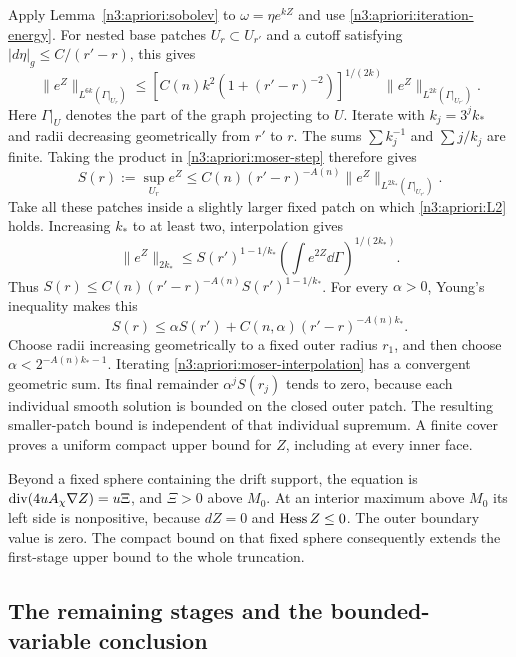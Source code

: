 Apply Lemma~\ref{n3:apriori:sobolev} to $\omega=\eta e^{kZ}$ and use
\eqref{n3:apriori:iteration-energy}.  For nested base patches
$U_r\subset U_{r'}$ and a cutoff satisfying
$|d\eta|_g\le C/(r'-r)$, this gives
\begin{equation}
 \|e^Z\|_{L^{6k}(\Gamma|_{U_r})}
 \le\left[C(n)k^2(1+(r'-r)^{-2})\right]^{1/(2k)}
                  \|e^Z\|_{L^{2k}(\Gamma|_{U_{r'}})}.
 \label{n3:apriori:moser-step}
\end{equation}
Here $\Gamma|_U$ denotes the part of the graph projecting to $U$.
Iterate with $k_j=3^jk_*$ and radii decreasing geometrically from
$r'$ to $r$.  The sums $\sum k_j^{-1}$ and $\sum j/k_j$ are finite.
Taking the product in \eqref{n3:apriori:moser-step} therefore gives
\begin{equation}
 S(r):=\sup_{U_r}e^Z
 \le C(n)(r'-r)^{-A(n)}
             \|e^Z\|_{L^{2k_*}(\Gamma|_{U_{r'}})}.
 \label{n3:apriori:moser-high-norm}
\end{equation}
Take all these patches inside a slightly larger fixed patch on
which \eqref{n3:apriori:L2} holds.  Increasing $k_*$ to at least two,
interpolation gives
\[
 \|e^Z\|_{2k_*}
 \le S(r')^{1-1/k_*}
                  \left(\int e^{2Z}\dd\Gamma\right)^{1/(2k_*)}.
\]
Thus $S(r)\le C(n)(r'-r)^{-A(n)}S(r')^{1-1/k_*}$.
For every $\alpha>0$, Young's inequality makes this
\begin{equation}
 S(r)\le\alpha S(r')+
                   C(n,\alpha)(r'-r)^{-A(n)k_*}.
 \label{n3:apriori:moser-interpolation}
\end{equation}
Choose radii increasing geometrically to a fixed outer radius $r_1$,
and then choose $\alpha<2^{-A(n)k_*-1}$.  Iterating
\eqref{n3:apriori:moser-interpolation} has a convergent geometric sum.
Its final remainder $\alpha^jS(r_j)$ tends to zero, because each
individual smooth solution is bounded on the closed outer patch.
The resulting smaller-patch bound is independent of that individual
supremum.  A finite cover proves a uniform compact upper bound for
$Z$, including at every inner face.

Beyond a fixed sphere containing the drift support, the equation is
$\operatorname{div}(4uA_\chi\nabla Z)=u\Xi$, and $\Xi>0$ above $M_0$.
At an interior maximum above $M_0$ its left side is nonpositive,
because $dZ=0$ and $\operatorname{Hess} Z\le0$.  The outer boundary value is zero.
The compact bound on that fixed sphere consequently extends the
first-stage upper bound to the whole truncation.

\subsection{The remaining stages and the bounded-variable conclusion}

